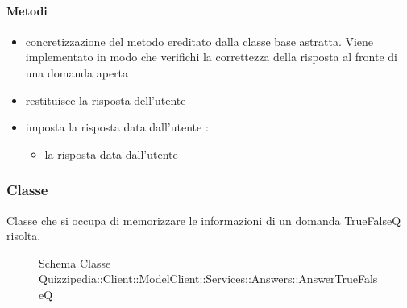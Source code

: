 \paragraph{Metodi}
\begin{itemize}
\item {}
\newline
concretizzazione del metodo ereditato dalla classe base astratta. Viene implementato in modo che verifichi la correttezza della risposta al fronte di una domanda aperta
\newline
\item {}
\newline
restituisce la risposta dell'utente
\newline
\item {}
\newline
imposta la risposta data dall'utente
\newline
{} :
\begin{itemize}
\item {}
\newline
la risposta data dall'utente
\end{itemize}
\end{itemize}
\subsubsection{Classe }
Classe che si occupa di memorizzare le informazioni di un domanda TrueFalseQ risolta.
\begin{figure}[H]
\centering
\noindent{}
\caption[Schema Classe AnswerTrueFalseQ]{Schema Classe Quizzipedia::Client::ModelClient::Services::Answers::AnswerTrueFalseQ}
\end{figure}
